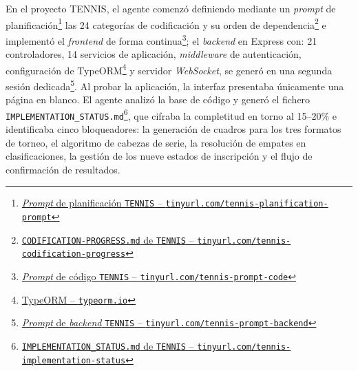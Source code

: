 En el proyecto \ac{TENNIS}, el agente comenzó definiendo mediante un \textit{prompt} de planificación\footnote{\href{https://github.com/alu0101549491/TFG-Fabian-Gonzalez-Lence/blob/main/resources/prompts/5-TennisTournamentManager/3-Codificacion/planning.prompt.md}{\textit{Prompt} de planificación \texttt{TENNIS} -- \texttt{tinyurl.com/tennis-planification-prompt}}} las 24 categorías de codificación y su orden de dependencia\footnote{\href{https://github.com/alu0101549491/TFG-Fabian-Gonzalez-Lence/blob/main/projects/5-TennisTournamentManager/docs/code/CODIFICATION-PROGRESS.md}{\texttt{CODIFICATION-PROGRESS.md} de \texttt{TENNIS} -- \texttt{tinyurl.com/tennis-codification-progress}}} e implementó el \textit{frontend} de forma continua\footnote{\href{https://github.com/alu0101549491/TFG-Fabian-Gonzalez-Lence/blob/main/resources/prompts/5-TennisTournamentManager/3-Codificacion/codification.prompt.md}{\textit{Prompt} de código \texttt{TENNIS} -- \texttt{tinyurl.com/tennis-prompt-code}}}; el \textit{backend} en Express con: 21 controladores, 14 servicios de aplicación, \textit{middleware} de autenticación, configuración de TypeORM\footnote{\href{https://typeorm.io/}{TypeORM -- \texttt{typeorm.io}}} y servidor \textit{WebSocket}, se generó en una segunda sesión dedicada\footnote{\href{https://github.com/alu0101549491/TFG-Fabian-Gonzalez-Lence/blob/main/resources/prompts/5-TennisTournamentManager/3-Codificacion/backend.prompt.md}{\textit{Prompt} de \textit{backend} \texttt{TENNIS} -- \texttt{tinyurl.com/tennis-prompt-backend}}}. Al probar la aplicación, la interfaz presentaba únicamente una página en blanco. El agente analizó la base de código y generó el fichero \texttt{IMPLEMENTATION\_STATUS.md}\footnote{\href{https://github.com/alu0101549491/TFG-Fabian-Gonzalez-Lence/blob/main/projects/5-TennisTournamentManager/docs/IMPLEMENTATION_STATUS.md}{\texttt{IMPLEMENTATION\_STATUS.md} de \texttt{TENNIS} -- \texttt{tinyurl.com/tennis-implementation-status}}}, que cifraba la completitud en torno al 15--20\% e identificaba cinco bloqueadores: la generación de cuadros para los tres formatos de torneo, el algoritmo de cabezas de serie, la resolución de empates en clasificaciones, la gestión de los nueve estados de inscripción y el flujo de confirmación de resultados.

